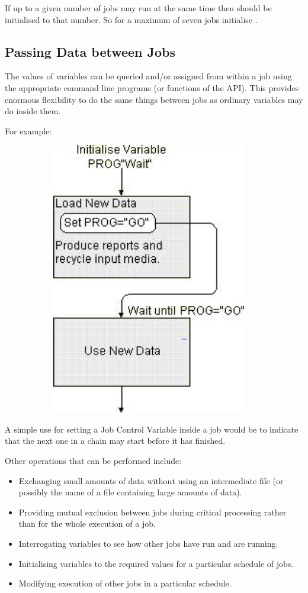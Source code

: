 If up to a given number of jobs may run at the same time then  should be initialised to that number. So for a maximum of seven jobs initialise .

\subsection{Passing Data between Jobs}
The values of variables can be queried and/or assigned from within a job using the appropriate command line programs (or functions of the API).
This provides enormous flexibility to do the same things between jobs as ordinary variables may do inside them.

For example:


\begin{figure}
\centering
\includegraphics[width=10.746cm,height=11.954cm]{img/ref11.jpg}
\end{figure}
A simple use for setting a Job Control Variable inside a job would be to indicate that the next one in a chain may start before it has finished.

Other operations that can be performed include:

\begin{itemize}
\item Exchanging small amounts of data without using an intermediate file (or possibly the name of a file containing large amounts of data).
\item Providing mutual exclusion between jobs during critical processing rather than for the whole execution of a job.
\item Interrogating variables to see how other jobs have run and are running.
\item Initialising variables to the required values for a particular schedule of jobs.
\item Modifying execution of other jobs in a particular schedule.
\end{itemize}
